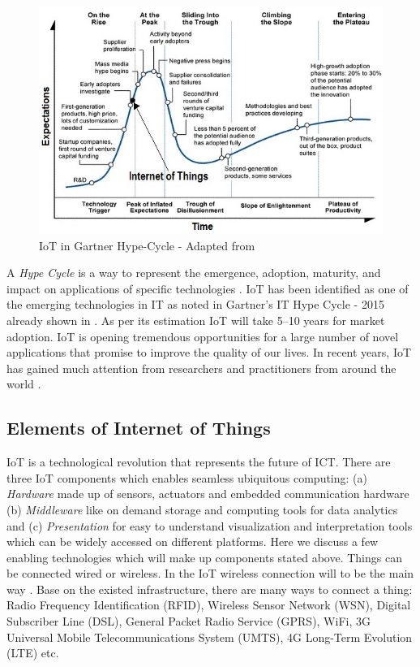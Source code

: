 \begin{figure}[h!]
	\includegraphics[scale=0.8]{./gfx/hypecycle}
	\centering
	\caption{\acs{IoT} in Gartner Hype-Cycle - Adapted from \cite{PICHYPECYC,HYPECYCGARTNER}}
	\label{fig:2.7}
\end{figure}

A \textit{Hype Cycle} is a way to represent the emergence, adoption, maturity, and impact on applications of specific technologies \cite{HYPECYCGARTNER}. \acs{IoT} has been identified as one of the emerging technologies in \acs{IT} as noted in Gartner’s \acs{IT} Hype Cycle - 2015 already shown in .  As per its estimation \acs{IoT} will take 5–10 years for market adoption. \acs{IoT} is opening tremendous opportunities for a large number of novel applications that promise to improve the quality of our lives. In recent years, \acs{IoT} has gained much attention from researchers and practitioners from around the world \cite{HYPECYCGARTNER,IOTXIA}.
\subsection{Elements of Internet of Things}
\acs{IoT} is a technological revolution that represents the future of \acs{ICT}. There are three \acs{IoT} components which enables seamless ubiquitous computing: (a) \textit{Hardware} made up of sensors, actuators and embedded communication hardware (b) \textit{Middleware} like on demand storage and computing tools for data analytics and (c) \textit{Presentation} for easy to understand visualization and interpretation tools which can be widely accessed on different platforms. Here we discuss a few enabling technologies which will make up components stated above. Things can be connected wired or wireless. In the \acs{IoT} wireless connection will to be the main way \cite{IOTGUBBI,IOTFUTURE}. Base on the existed infrastructure, there are many ways to connect a thing: Radio Frequency Identification (\acs{RFID}), Wireless Sensor Network (\acs{WSN}), Digital Subscriber Line (\acs{DSL}), General Packet Radio Service (\acs{GPRS}), WiFi, 3G Universal Mobile Telecommunications System (\acs{UMTS}), 4G Long-Term Evolution (\acs{LTE}) etc.
